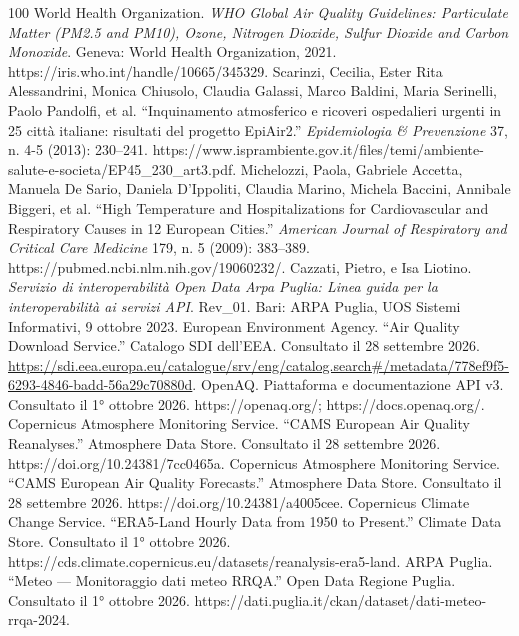 \begin{thebibliography}{100}
         World Health Organization. \emph{WHO Global Air Quality Guidelines: Particulate Matter (PM2.5 and PM10), Ozone, Nitrogen Dioxide, Sulfur Dioxide and Carbon Monoxide}. Geneva: World Health Organization, 2021. https://iris.who.int/handle/10665/345329.
         Scarinzi, Cecilia, Ester Rita Alessandrini, Monica Chiusolo, Claudia Galassi, Marco Baldini, Maria Serinelli, Paolo Pandolfi, et al. ``Inquinamento atmosferico e ricoveri ospedalieri urgenti in 25 città italiane: risultati del progetto EpiAir2.'' \emph{Epidemiologia \& Prevenzione} 37, n. 4-5 (2013): 230--241. https://www.isprambiente.gov.it/files/temi/ambiente-salute-e-societa/EP45\_230\_art3.pdf.
         Michelozzi, Paola, Gabriele Accetta, Manuela De Sario, Daniela D'Ippoliti, Claudia Marino, Michela Baccini, Annibale Biggeri, et al. ``High Temperature and Hospitalizations for Cardiovascular and Respiratory Causes in 12 European Cities.'' \emph{American Journal of Respiratory and Critical Care Medicine} 179, n. 5 (2009): 383--389. https://pubmed.ncbi.nlm.nih.gov/19060232/.
         Cazzati, Pietro, e Isa Liotino. \emph{Servizio di interoperabilità Open Data Arpa Puglia: Linea guida per la interoperabilità ai servizi API}. Rev\_01. Bari: ARPA Puglia, UOS Sistemi Informativi, 9 ottobre 2023.
         European Environment Agency. ``Air Quality Download Service.'' Catalogo SDI dell'EEA. Consultato il 28 settembre 2026. \url{https://sdi.eea.europa.eu/catalogue/srv/eng/catalog.search#/metadata/778ef9f5-6293-4846-badd-56a29c70880d}.
         OpenAQ. Piattaforma e documentazione API v3. Consultato il 1° ottobre 2026. https://openaq.org/; https://docs.openaq.org/.
         Copernicus Atmosphere Monitoring Service. ``CAMS European Air Quality Reanalyses.'' Atmosphere Data Store. Consultato il 28 settembre 2026. https://doi.org/10.24381/7cc0465a.
         Copernicus Atmosphere Monitoring Service. ``CAMS European Air Quality Forecasts.'' Atmosphere Data Store. Consultato il 28 settembre 2026. https://doi.org/10.24381/a4005cee.
         Copernicus Climate Change Service. ``ERA5-Land Hourly Data from 1950 to Present.'' Climate Data Store. Consultato il 1° ottobre 2026. https://cds.climate.copernicus.eu/datasets/reanalysis-era5-land.
         ARPA Puglia. ``Meteo --- Monitoraggio dati meteo RRQA.'' Open Data Regione Puglia. Consultato il 1° ottobre 2026. https://dati.puglia.it/ckan/dataset/dati-meteo-rrqa-2024.

\end{thebibliography}
